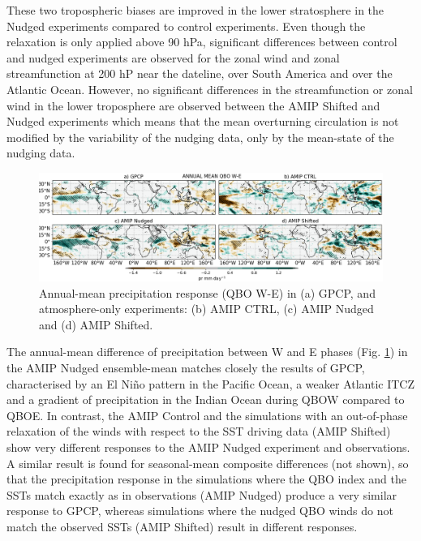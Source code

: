 These two tropospheric biases are improved in the lower stratosphere in the Nudged experiments compared to control experiments. Even though the relaxation is only applied above 90 hPa, significant differences between control and nudged experiments are observed for the zonal wind and zonal streamfunction at 200 hP near the dateline, over South America and over the Atlantic Ocean. 
However, no significant differences in the streamfunction or zonal wind in the lower troposphere are observed between the AMIP Shifted and Nudged experiments which means that the mean overturning circulation is not modified by the variability of the nudging data, only by the mean-state of the nudging data. 

\begin{figure}[t!]
\centering
 \includegraphics[width=\linewidth]{figures/pr_amip_climqbowqboe.png}
\caption[Annual mean precipitation response in atmosphere-only experiments]{Annual-mean precipitation response (QBO W-E) in (a) GPCP, and atmosphere-only experiments: (b) AMIP CTRL, (c) AMIP Nudged and (d) AMIP Shifted.  }
\label{fig:amip_clim}
\end{figure}

The annual-mean difference of precipitation between W and E phases (Fig. \ref{fig:amip_clim}) in the AMIP Nudged ensemble-mean matches closely the results of GPCP, characterised by an El Niño pattern in the Pacific Ocean, a weaker Atlantic ITCZ and a gradient of precipitation in the Indian Ocean during QBOW compared to QBOE. 
In contrast, the AMIP Control and the simulations with an out-of-phase relaxation of the winds with respect to the SST driving data (AMIP Shifted) show very different responses to the AMIP Nudged experiment and observations. A similar result is found for seasonal-mean composite differences (not shown), so that the precipitation response in the simulations where the QBO index and the SSTs match exactly as in observations (AMIP Nudged) produce a very similar response to GPCP, whereas simulations where the nudged QBO winds do not match the observed SSTs (AMIP Shifted) result in different responses. 

